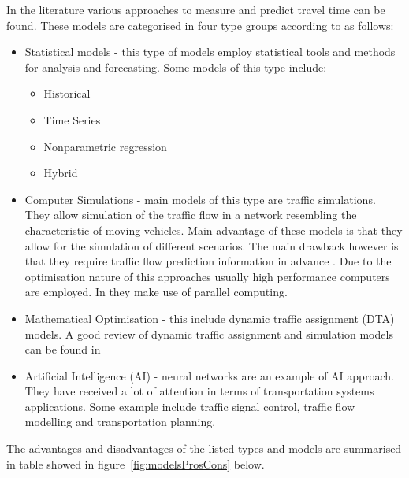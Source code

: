 In the literature various approaches to measure and predict travel time can be found. These models are categorised in four type groups according to \cite{youKim} as follows:
\begin{itemize}
	\item Statistical models - this type of models employ statistical tools and methods for analysis and forecasting. Some models of this type include:
	\begin{itemize}
		\item Historical
		\item Time Series
		\item Nonparametric regression
		\item Hybrid
	\end{itemize}
	
	\item Computer Simulations - main models of this type are traffic simulations. They allow simulation of the traffic flow in a network resembling the characteristic of moving vehicles. Main advantage of these models is that they allow for the simulation of different scenarios. The main drawback however is that they require traffic flow prediction information in advance \cite{smith1997traffic}. Due to the optimisation nature of this approaches usually high performance computers are employed. In \cite{junchaya1992advanced} they make use of parallel computing.
	
	\item Mathematical Optimisation - this include dynamic traffic assignment (DTA) models. A good review of dynamic traffic assignment and simulation models can be found in \cite{mahmassani1991review}

	\item Artificial Intelligence (AI) - neural networks are an example of AI approach. They have received a lot of attention in terms of transportation systems applications. Some example include traffic signal control, traffic flow modelling and transportation planning\cite{gilmore1995neural,Dougherty199721,smith1997traffic}.
\end{itemize}

The advantages and disadvantages of the listed types and models are summarised in table showed in figure~\ref{fig:modelsProsCons} below.

